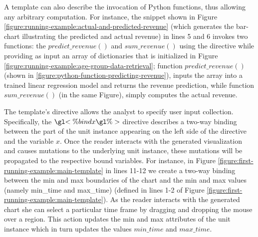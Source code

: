 A template can also describe the invocation of Python functions, thus allowing any arbitrary computation. For instance, the snippet shown in Figure \ref{figure:running-example:actual-and-predicted-revenue} (which generates the bar-chart illustrating the predicted and actual revenue) in lines 5 and 6 invokes two functions: the $predict\_revenue()$ and $sum\_revenue()$ using the  directive while providing as input an array of dictionaries that is initialized in Figure \ref{figure:running-example:age-group-data-retrieval}; function $predict\_revenue()$ (shown in \ref{figure:python-function-predicting-revenue}), inputs the array into a trained linear regression model and returns the revenue prediction, while function $sum\_revenue()$ (in the same Figure), simply computes the actual revenue.







 The template's  directive allows the analyst to specify user input collection. Specifically, the $\gl{<\% bind x} \gl{ \%>}$ directive describes a two-way binding between the part of the unit instance appearing on the left side of the directive and the variable $x$. Once the reader interacts with the generated visualization and causes mutations to the underlying unit instance, these mutations will be propagated to the respective bound variables. For instance, in Figure \ref{figure:first-running-example:main-template} in lines 11-12 we create a two-way binding between the min and max boundaries of the chart and the min and max values (namely min\_time and max\_time) (defined in lines 1-2 of Figure \ref{figure:first-running-example:main-template}). As the reader interacts with the generated chart she can select a particular time frame by dragging and dropping the mouse over a region. This action updates the min and max attributes of the unit instance which in turn updates the values $min\_time$ and $max\_time$. 

